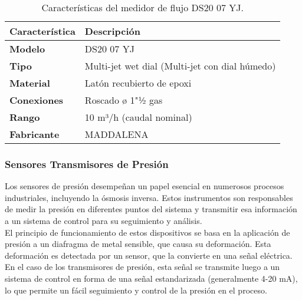 

\begin{table}[H]
    \centering
    \caption{Características del medidor de flujo DS20 07 YJ.}
    \label{table:sensor_transmisor_flujo2}
    \begin{tabular}{| L{6cm} | L{6cm} |}
        \hline
        \textbf{Característica} & \textbf{Descripción}                           \\
        \hline
        \textbf{Modelo}         & DS20 07 YJ                                     \\
        \hline
        \textbf{Tipo}           & Multi-jet wet dial (Multi-jet con dial húmedo) \\
        \hline
        \textbf{Material}       & Latón recubierto de epoxi                      \\
        \hline
        \textbf{Conexiones}     & Roscado ø 1"½ gas                              \\
        \hline
        \textbf{Rango}          & 10 m³/h (caudal nominal)                       \\
        \hline
        \textbf{Fabricante}     & MADDALENA                                      \\
        \hline
    \end{tabular}
\end{table}

\subsubsection{Sensores Transmisores de Presión} \label{sec:sensor_presion}

Los sensores de presión desempeñan un papel esencial en numerosos procesos industriales,
incluyendo la ósmosis inversa. Estos instrumentos son responsables de medir la presión en diferentes puntos
del sistema y transmitir esa información a un sistema de control para su seguimiento y análisis.\\

El principio de funcionamiento de estos dispositivos se basa en la aplicación de presión a un diafragma de
metal sensible, que causa su deformación. Esta deformación es detectada por un sensor, que la convierte en
una señal eléctrica. En el caso de los transmisores de presión, esta señal se transmite luego a un sistema de control en forma
de una señal estandarizada (generalmente 4-20 mA), lo que permite un fácil seguimiento y control de la presión en el proceso.\\

